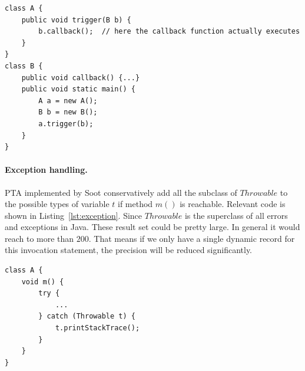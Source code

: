 \documentclass{fac}
\begin{document}
\begin{lstlisting}[caption={Example code for Callback mechanism},label={lst:callback}]
class A {
	public void trigger(B b) {
		b.callback();  // here the callback function actually executes
	}
}
class B {
	public void callback() {...}
	public void static main() {
		A a = new A();
		B b = new B();
		a.trigger(b);
	}
}
\end{lstlisting}


\paragraph{Exception handling.} PTA implemented by Soot conservatively add all the subclass of $Throwable$ to the possible types of variable $t$ if method $m()$ is reachable. Relevant code is shown in Listing~\ref{lst:exception}. Since $Throwable$ is the superclass of all errors and exceptions in Java. These result set could be pretty large. In general it would reach to more than $200$. That means if we only have a single dynamic record for this invocation statement, the precision will be reduced significantly.

\begin{lstlisting}[caption={Example code for Exception handling},label={lst:exception}]
class A {
	void m() {
		try {
			...
		} catch (Throwable t) {
			t.printStackTrace();
		}
	}
}
\end{lstlisting}

\newcommand\commentout[1]{}
\end{document}
